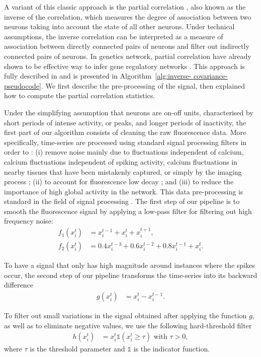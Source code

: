 \documentclass[wcp]{jmlr}
\begin{document}
A variant of this classic approach is the partial correlation
\citep{sutera2014simple}, also known as the inverse of the correlation, which
measures the degree of association between two neurons taking into account the
state of all other neurons. Under technical assumptions, the inverse
correlation can be interpreted as a measure of association between directly
connected pairs of neurons and filter out indirectly connected pairs of
neurons. In genetics network, partial correlation have already shown to be
effective way to infer gene regulatory networks
\citep{de2004discovery,Schafer:2005}. This approach is fully described in
\cite{sutera2014simple} and is presented in Algorithm~\ref{alg:inverse-
covariance- pseudocode}. We first describe the pre-processing of the signal,
then explained how to compute the partial  correlation statistics.


Under the simplifying assumption that neurons are on-off units, characterised
by short periods of intense activity, or peaks, and longer periods of
inactivity, the first part of our algorithm consists of cleaning the raw
fluorescence data. More specifically, time-series are processed using standard
signal processing filters in order to : (i) remove noise mainly due to
fluctuations independent of calcium, calcium fluctuations independent of
spiking activity, calcium fluctuations in nearby tissues that have been
mistakenly captured, or simply by the imaging process ; (ii) to account for
fluorescence low decay ; and (iii) to reduce the importance of high global
activity in the network. This data pre-processing is standard  in the field of
signal processing \citep{kaiser1977data, oppenheim1983signals}.
The first step of our pipeline is to smooth the fluorescence signal by applying a low-pass filter for filtering out high frequency noise:
\begin{align}
f_1(x^t_i) &= x^{t-1}_i + x^t_i + x^{t+1}_i, \label{eq:symetric-median} \\
f_2(x^t_i) &= 0.4 x^{t-3}_i + 0.6 x^{t-2}_i + 0.8 x^{t-1}_i + x_i^t.
\label{eq:weighted-asymetric-median}
\end{align}

To have a signal that only has high magnitude around instances where the spikes occur, the second step of our pipeline transforms the time-series into its backward difference
\begin{align}
g(x^{t}_{i}) &= x^{t}_i - x^{t-1}_i. \label{eq:high-pass-filter}
\end{align}

To filter out small variations in the signal obtained after applying the
function $g$, as well as to eliminate negative values, we use the following
hard-threshold filter
\begin{align}\label{eqn:hfilter}
h(x^{t}_i) &= x^{t}_i \mathbb{1}(x^{t}_i \geq \tau) \text{ with } \tau > 0,
\end{align}
where $\tau$ is the threshold parameter and $\mathbb{1}$ is the indicator
function.
\end{document}
